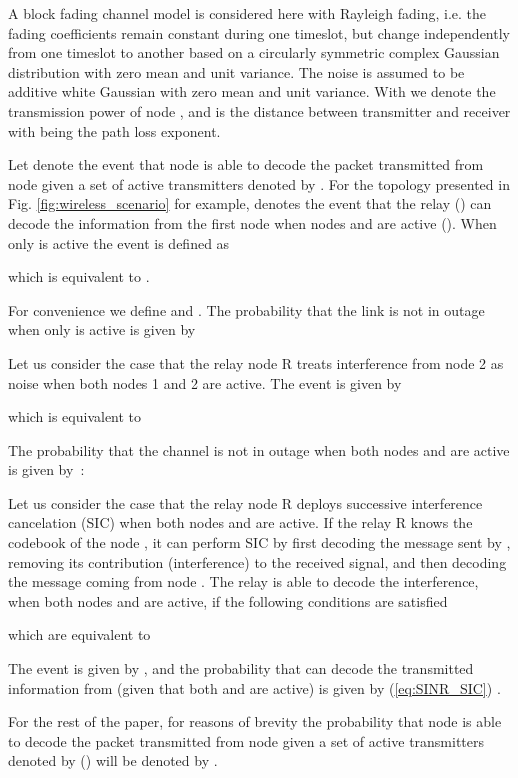 \documentclass[conference]{IEEEtran}
\begin{document}
A block fading channel model is considered here with Rayleigh fading, i.e. the fading coefficients  remain constant during one timeslot, but
change independently from one timeslot to another based on a circularly symmetric complex Gaussian distribution with zero mean and unit variance.
The noise is assumed to be additive white Gaussian with zero mean and unit variance. With  we denote the transmission power of node , and  is the
distance between transmitter  and receiver  with  being the path loss exponent.

Let  denote the event that node  is able to decode the packet transmitted from node  given a set of active transmitters
denoted by .
For the topology presented in Fig. \ref{fig:wireless_scenario} for example,
 denotes the event that the relay () can decode the information from the first node when
nodes  and  are active (). When only  is active the event  is defined as

which is equivalent to .

For convenience we define  and . The probability that the link  is not in outage when only  is active is given by~\cite{b:Tse}


Let us consider the case that the relay node R treats interference from node 2 as noise when both nodes 1 and 2 are active. 
The event  is given by

which is equivalent to


The probability that the channel  is not in outage when both nodes  and  are active is given by~\cite{b:Tse}:
 

Let us consider the case that the relay node R deploys successive interference cancelation (SIC) when both nodes  and  are active. 
If the relay R knows the codebook of the node , it can perform SIC by first decoding the message sent by , removing
its contribution (interference) to the received signal, and then decoding  the message coming from node .
The relay  is able to decode the interference, when both nodes  and  are active, if the following conditions are satisfied

which are equivalent to


The event  is given by ,
and the probability that  can decode the transmitted information from  (given that both  and  are active) is given by (\ref{eq:SINR_SIC}) \cite{b:PappasITW13}.

{ \scriptsize

}

For the rest of the paper, for reasons of brevity the probability that node  is able to decode
the packet transmitted from node  given a set of active transmitters denoted by  ()
will be denoted by .
\end{document}
